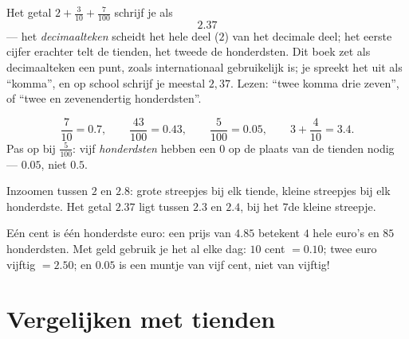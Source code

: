 \begin{definition}\label{def:g4:decimals:point}
Het getal $2 + \frac{3}{10} + \frac{7}{100}$ schrijf je als
\[
2.37
\]
--- het \emph{decimaalteken} scheidt het hele deel
($2$) van het decimale deel; het eerste cijfer erachter telt de tienden,
het tweede de honderdsten. Dit boek zet als decimaalteken een punt, zoals
internationaal gebruikelijk is; je spreekt het uit als ``komma'', en op
school schrijf je meestal $2{,}37$. Lezen: ``twee komma drie zeven'', of
``twee en zevenendertig honderdsten''.
\end{definition}

\begin{example}\label{ex:g4:decimals:convert}
\[
\frac{7}{10} = 0.7, \qquad
\frac{43}{100} = 0.43, \qquad
\frac{5}{100} = 0.05, \qquad
3 + \frac{4}{10} = 3.4 .
\]
Pas op bij $\frac{5}{100}$: vijf \emph{honderdsten} hebben een $0$ op de
plaats van de tienden nodig --- $0.05$, niet $0.5$.
\end{example}

\begin{omfigure}

{\small Inzoomen tussen $2$ en $2.8$: grote streepjes bij elk tiende,
kleine streepjes bij elk honderdste. Het getal $2.37$ ligt tussen $2.3$ en
$2.4$, bij het $7$de kleine streepje.}
\end{omfigure}

\begin{example}\label{ex:g4:decimals:money}
Eén cent is één honderdste euro: een prijs van $4.85$ betekent $4$ hele
euro's en $85$ honderdsten. Met geld gebruik je het  al elke
dag: $10$ cent $= 0.10$; twee euro vijftig $= 2.50$; en $0.05$ is een
muntje van vijf cent, niet van vijftig!
\end{example}

\section{Vergelijken met tienden}

